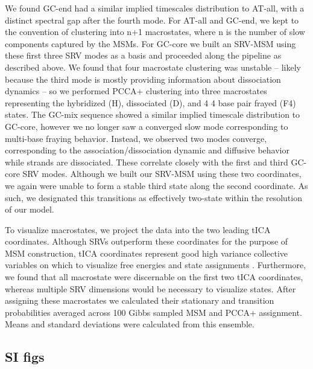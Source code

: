 \documentclass[journal=jpcbfk,manuscript=article]{achemso}
\begin{document}
We found GC-end had a similar implied timescales distribution to AT-all, with a distinct spectral gap after the fourth mode. For AT-all and GC-end, we kept to the convention of clustering into n+1 macrostates, where n is the number of slow components captured by the MSMs. For GC-core we built an SRV-MSM using these first three SRV modes as a basis and proceeded along the pipeline as described above. We found that four macrostate clustering was unstable -- likely because the third mode is mostly providing  information about dissociation dynamics -- so we performed PCCA+ clustering into three macrostates representing the hybridized (H), dissociated (D), and 4 4 base pair frayed (F4) states.  The GC-mix sequence showed a similar implied timescale distribution to GC-core, however we no longer saw a converged slow mode corresponding to multi-base fraying behavior. Instead, we observed two modes converge, corresponding to the association/dissociation dynamic and diffusive behavior while strands are dissociated. These correlate closely with the first and third GC-core SRV modes. Although we built our SRV-MSM using these two coordinates, we again were unable to form a stable third state along the second coordinate. As such, we designated this transitions as effectively two-state within the resolution of our model.


To visualize macrostates, we project the data into the two leading tICA coordinates. Although SRVs outperform these coordinates for the purpose of MSM construction, tICA coordinates represent good high variance collective variables on which to visualize free energies and state assignments \citep{Sidky}. Furthermore, we found that all macrostate were discernable on the first two tICA coordinates, whereas multiple SRV dimensions would be necessary to visualize states. After assigning these macrostates we calculated their stationary and transition probabilities averaged across 100 Gibbs sampled MSM and PCCA+ assignment. Means and standard deviations were calculated from this ensemble.




\subsection{\label{sec:Results}SI figs}
\end{document}
